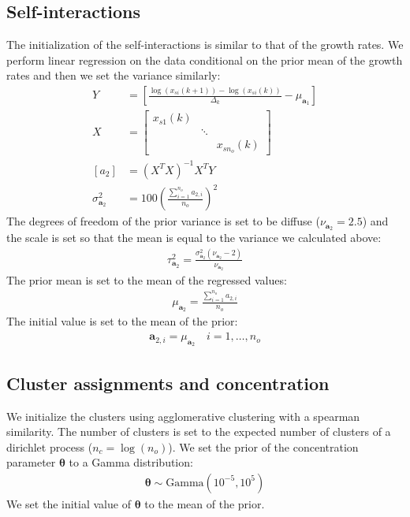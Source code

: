 \documentclass{article}
\newcommand{\Gammadist}{\text{Gamma}}
\newcommand{\concc}{\mathbf{\theta}}
\newcommand{\growth}{\mathbf{a}_1}
\newcommand{\meangrowth}{\mu_{\growth}}
\newcommand{\si}{\mathbf{a}_2}
\newcommand{\sii}[1]{\mathbf{a}_{2,#1}}
\newcommand{\meansi}{\mu_{\si}}
\newcommand{\varsi}{\sigma^2_{\si}}
\newcommand{\dofsi}{\nu_{\si}}
\newcommand{\scalesi}{\tau^2_{\si}}
\newcommand{\dt}{\Delta_k}
\begin{document}
\subsection{Self-interactions}
The initialization of the self-interactions is similar to that of the growth rates. We perform linear regression on the data conditional on the prior mean of the growth rates and then we set the variance similarly:
\begin{align}
     Y & = \left[ 
        \frac{\log (x_{si}(k+1)) - \log ( x_{si}(k) )}{\dt} 
        - \meangrowth \right] \\
     X & =
        \begin{bmatrix}
            x_{s1}(k) & & \\
            & \ddots & \\
            & & x_{s n_o}(k)
        \end{bmatrix} \\
    [a_2] & = (X^T X)^{-1} X^T Y \\
    \varsi & = 100 \left(
        \frac{\sum_{i=1}^{n_o} a_{2,i} }{n_o}
    \right)^2
\end{align}
The degrees of freedom of the prior variance is set to be diffuse ($\dofsi = 2.5$) and the scale is set so that the mean is equal to the variance we calculated above:
\begin{align}
    \scalesi = \frac{\varsi (\dofsi - 2)}{\dofsi}
\end{align}
The prior mean is set to the mean of the regressed values:
\begin{align}
    \meansi = \frac{\sum_{i=1}^{n_o}a_{2,i}}{n_o}
\end{align}
The initial value is set to the mean of the prior:
\begin{align}
    \sii{i} = \meansi \quad i = 1, \dots , n_o
\end{align}

\subsection{Cluster assignments and concentration}
We initialize the clusters using agglomerative clustering with a spearman similarity. The number of clusters is set to the expected number of clusters of a dirichlet process ($n_c = \log (n_o )$). We set the prior of the concentration parameter $\concc$ to a Gamma distribution:
\begin{align}
    \concc \sim \Gammadist (10^{-5}, 10^{5})
\end{align}
We set the initial value of $\concc$ to the mean of the prior.
\end{document}
